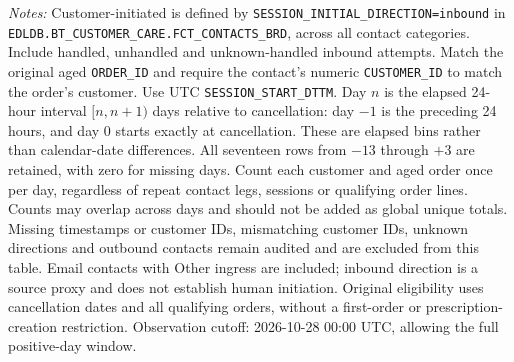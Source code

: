 \begin{table}[!htbp]
\begin{minipage}{\linewidth}
\footnotesize
\textit{Notes:} Customer-initiated is defined by
\texttt{SESSION\_INITIAL\_DIRECTION=inbound} in
\texttt{EDLDB.BT\_CUSTOMER\_CARE.FCT\_CONTACTS\_BRD}, across all contact
categories. Include handled, unhandled and unknown-handled inbound attempts. Match the original aged \texttt{ORDER\_ID} and require
the contact's numeric \texttt{CUSTOMER\_ID} to match the order's customer.
Use UTC \texttt{SESSION\_START\_DTTM}. Day $n$ is the elapsed 24-hour interval
$[n,n+1)$ days relative to cancellation: day $-1$ is the preceding 24 hours,
and day $0$ starts exactly at cancellation. These are elapsed bins rather
than calendar-date differences. All seventeen rows from $-13$ through $+3$
are retained, with zero for missing days. Count each customer and aged order
once per day, regardless of repeat contact legs, sessions or qualifying order
lines. Counts may overlap across days and should not be added as global unique
totals. Missing timestamps or customer IDs, mismatching customer IDs, unknown
directions and outbound contacts remain audited and are excluded from this
table. Email contacts with Other ingress are included; inbound direction is
a source proxy and does not establish human initiation.
Original eligibility uses cancellation
dates and all qualifying orders, without a first-order or prescription-creation
restriction. Observation cutoff: 2026-10-28 00:00 UTC, allowing the full positive-day window.
\end{minipage}
\end{table}